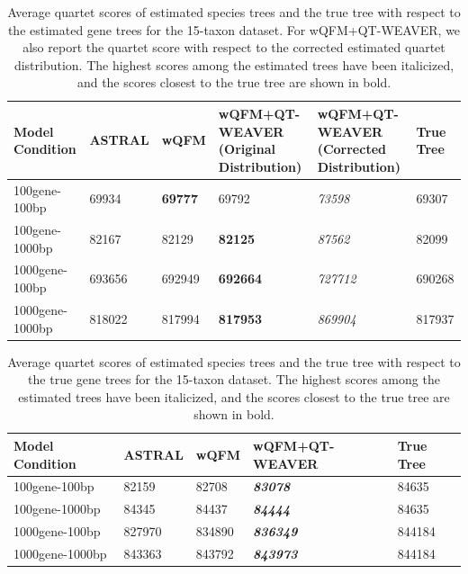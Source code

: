 \documentclass[10pt,a4paper]{article}
\begin{document}
\begin{table}[h!]
    \centering
    \caption{Average quartet scores of estimated species trees and the true tree with respect to the estimated gene trees for the 15-taxon dataset. For wQFM+QT-WEAVER, we also report the quartet score with respect to the corrected estimated quartet distribution. The highest scores among the estimated trees have been italicized, and the scores closest to the true tree are shown in bold.}
    \label{tab:15-quartet-scores-estimated}
    \begin{tabular}{|C{2cm}|C{2.5cm}|C{2.5cm}|C{2.5cm}|C{2.5cm}|C{2.5cm}|}
        \hline
        \textbf{Model Condition} & \textbf{ASTRAL} & \textbf{wQFM} & \textbf{wQFM+QT-WEAVER (Original Distribution)} & \textbf{wQFM+QT-WEAVER (Corrected Distribution)} & \textbf{True Tree} \\
        \hline \hline
        100gene-100bp & 69934 & \textbf{69777} & 69792 & \textit{73598} & 69307 \\
        \hline
        100gene-1000bp & 82167 & 82129 & \textbf{82125} & \textit{87562} & 82099 \\
        \hline
        1000gene-100bp & 693656 & 692949 & \textbf{692664} & \textit{727712} & 690268 \\
        \hline
        1000gene-1000bp & 818022 & 817994 & \textbf{817953} & \textit{869904} & 817937 \\
        \hline
    \end{tabular}
\end{table}

\begin{table}[h!]
    \centering
    \caption{Average quartet scores of estimated species trees and the true tree with respect to the true gene trees for the 15-taxon dataset. The highest scores among the estimated trees have been italicized, and the scores closest to the true tree are shown in bold.}
    \label{tab:15-quartet-scores-true}
    \begin{tabular}{|C{2.3cm}|C{3cm}|C{3cm}|C{3cm}|C{3cm}|}
        \hline
        \textbf{Model Condition} & \textbf{ASTRAL} & \textbf{wQFM} & \textbf{wQFM+QT-WEAVER} & \textbf{True  Tree} \\
        \hline \hline
        100gene-100bp & 82159 & 82708 & \textbf{\textit{83078}} & 84635 \\
        \hline
        100gene-1000bp & 84345 & 84437 & \textbf{\textit{84444}} & 84635 \\
        \hline
        1000gene-100bp & 827970 & 834890 & \textbf{\textit{836349}} & 844184 \\
        \hline
        1000gene-1000bp & 843363 & 843792 & \textbf{\textit{843973}} & 844184 \\
        \hline
    \end{tabular}
\end{table}
\end{document}

